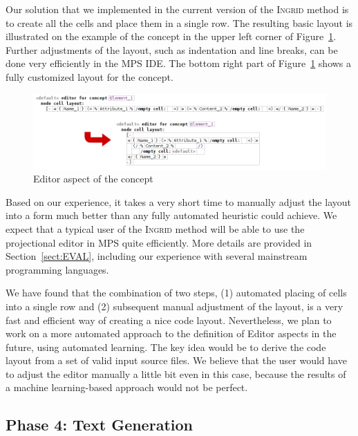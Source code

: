 Our solution that we implemented in the current version of the \textsc{Ingrid} method is to create all the cells and place them in a single row.
The resulting basic layout is illustrated on the example of the  concept in the upper left corner of Figure~\ref{fig:EDITORADJUST}.
Further adjustments of the layout, such as indentation and line breaks, can be done very efficiently in the MPS IDE.
The bottom right part of Figure~\ref{fig:EDITORADJUST} shows a fully customized layout for the  concept.

\begin{figure}[ht]
	\centering
	\includegraphics[scale=0.55]{./images/editor_adjustment.png}
	\caption{Editor aspect of the  concept}
	\label{fig:EDITORADJUST}
\end{figure}

Based on our experience, it takes a very short time to manually adjust the layout into a form much better than any fully automated heuristic could achieve.
We expect that a typical user of the \textsc{Ingrid} method will be able to use the projectional editor in MPS quite efficiently.
More details are provided in Section~\ref{sect:EVAL}, including our experience with several mainstream programming languages.

We have found that the combination of two steps, (1) automated placing of cells into a single row and (2) subsequent manual adjustment of the layout, is a very fast and efficient way of creating a nice code layout.
Nevertheless, we plan to work on a more automated approach to the definition of Editor aspects in the future, using automated learning.
The key idea would be to derive the code layout from a set of valid input source files.
We believe that the user would have to adjust the editor manually a little bit even in this case, because the results of a machine learning-based approach would not be perfect.

\subsection{Phase 4: Text Generation}
\label{sect:TEXTGENDEF}

